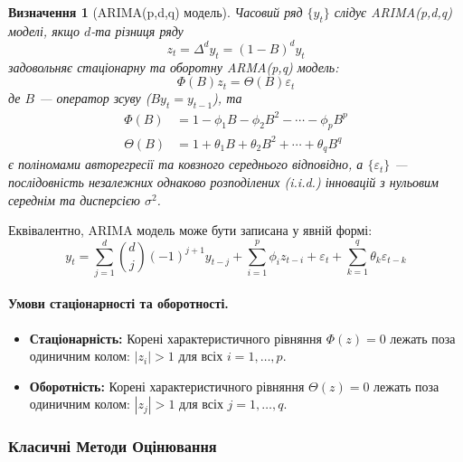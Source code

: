 \documentclass[12pt,a4paper]{article}
\newtheorem{definition}[theorem]{Визначення}
\begin{document}
	\begin{definition}[ARIMA(p,d,q) модель]
		Часовий ряд $\{y_t\}$ слідує ARIMA(p,d,q) моделі, якщо $d$-та різниця ряду
		\begin{equation}
			\label{eq:differencing}
			z_t = \Delta^d y_t = (1-B)^d y_t
		\end{equation}
		задовольняє стаціонарну та оборотну ARMA(p,q) модель:
		\begin{equation}
			\label{eq:arma}
			\Phi(B) z_t = \Theta(B) \varepsilon_t
		\end{equation}
		де $B$ --- оператор зсуву ($B y_t = y_{t-1}$), та
		\begin{align}
			\Phi(B) &= 1 - \phi_1 B - \phi_2 B^2 - \cdots - \phi_p B^p \label{eq:ar_poly} \\
			\Theta(B) &= 1 + \theta_1 B + \theta_2 B^2 + \cdots + \theta_q B^q \label{eq:ma_poly}
		\end{align}
		є поліномами авторегресії та ковзного середнього відповідно, а $\{\varepsilon_t\}$ --- послідовність незалежних однаково розподілених (i.i.d.) інновацій з нульовим середнім та дисперсією $\sigma^2$.
	\end{definition}
	
	Еквівалентно, ARIMA модель може бути записана у явній формі:
	\begin{equation}
		\label{eq:arima_explicit}
		y_t = \sum_{j=1}^{d} \binom{d}{j} (-1)^{j+1} y_{t-j} + \sum_{i=1}^{p} \phi_i z_{t-i} + \varepsilon_t + \sum_{k=1}^{q} \theta_k \varepsilon_{t-k}
	\end{equation}
	
	\paragraph{Умови стаціонарності та оборотності.}
	
	\begin{itemize}
		\item \textbf{Стаціонарність:} Корені характеристичного рівняння $\Phi(z) = 0$ лежать поза одиничним колом: $|z_i| > 1$ для всіх $i = 1, \ldots, p$.
		
		\item \textbf{Оборотність:} Корені характеристичного рівняння $\Theta(z) = 0$ лежать поза одиничним колом: $|z_j| > 1$ для всіх $j = 1, \ldots, q$.
	\end{itemize}
	
	\subsubsection{Класичні Методи Оцінювання}
	
\end{document}
